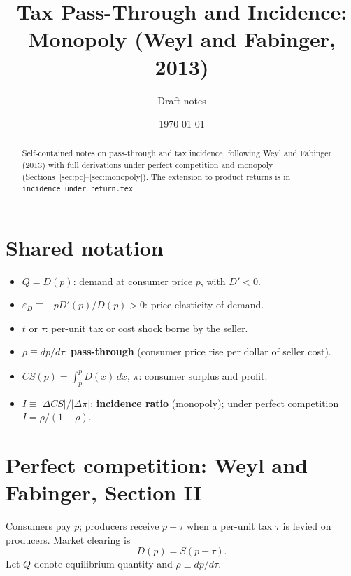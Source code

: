 \documentclass[11pt]{article}
\title{Tax Pass-Through and Incidence:\\
Monopoly (Weyl and Fabinger, 2013)}
\author{Draft notes}
\date{\today}
\begin{document}
\maketitle

\begin{abstract}
Self-contained notes on pass-through and tax incidence, following
Weyl and Fabinger (2013) with full derivations under perfect competition
and monopoly (Sections~\ref{sec:pc}--\ref{sec:monopoly}).  The extension to
product returns is in \texttt{incidence\_under\_return.tex}.
\end{abstract}

\section{Shared notation}
\label{sec:notation}

\begin{itemize}
  \item $Q = D(p)$: demand at consumer price $p$, with $D' < 0$.
  \item $\varepsilon_D \equiv -p D'(p)/D(p) > 0$: price elasticity of demand.
  \item $t$ or $\tau$: per-unit tax or cost shock borne by the seller.
  \item $\rho \equiv dp/d\tau$: \textbf{pass-through} (consumer price rise per
    dollar of seller cost).
  \item $CS(p) = \int_p^{\bar p} D(x)\,dx$, $\pi$: consumer surplus and profit.
  \item $I \equiv |\Delta CS|/|\Delta \pi|$: \textbf{incidence ratio} (monopoly);
    under perfect competition $I = \rho/(1-\rho)$.
\end{itemize}

\section{Perfect competition: Weyl and Fabinger, Section II}
\label{sec:pc}

Consumers pay $p$; producers receive $p - \tau$ when a per-unit tax $\tau$ is
levied on producers.  Market clearing is
\begin{equation}
  D(p) = S(p - \tau).
  \label{eq:pc-clearing}
\end{equation}
Let $Q$ denote equilibrium quantity and $\rho \equiv dp/d\tau$.
\end{document}
